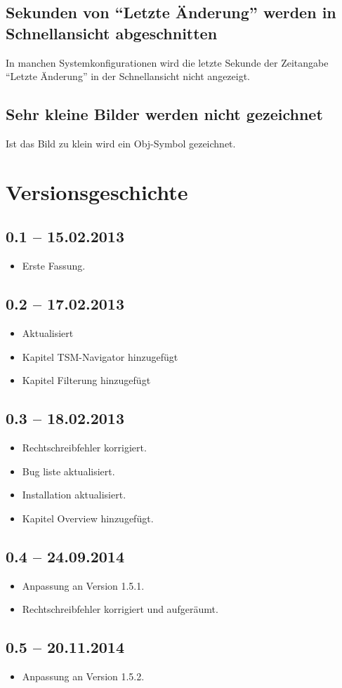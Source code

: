 \documentclass[11pt,a4paper,titlepage]{article}
\begin{document}
\subsection*{Sekunden von "`Letzte Änderung"' werden in Schnellansicht abgeschnitten}
In manchen Systemkonfigurationen wird die letzte Sekunde der Zeitangabe "`Letzte Änderung"' in der Schnellansicht nicht angezeigt.

\subsection*{Sehr kleine Bilder werden nicht gezeichnet}
Ist das Bild zu klein wird ein Obj-Symbol gezeichnet.


\section{Versionsgeschichte}

\subsection*{0.1 -- 15.02.2013}
\begin{itemize}
 \item Erste Fassung.
\end{itemize}

\subsection*{0.2 -- 17.02.2013}
\begin{itemize}
 \item Aktualisiert
 \item Kapitel TSM-Navigator hinzugefügt
 \item Kapitel Filterung hinzugefügt
\end{itemize}
 
\subsection*{0.3 -- 18.02.2013}
\begin{itemize}
 \item Rechtschreibfehler korrigiert.
 \item Bug liste aktualisiert.
 \item Installation aktualisiert.
 \item Kapitel Overview hinzugefügt.
\end{itemize}

\subsection*{0.4 -- 24.09.2014}
\begin{itemize}
 \item Anpassung an Version 1.5.1.
 \item Rechtschreibfehler korrigiert und aufgeräumt.
\end{itemize}

\subsection*{0.5 -- 20.11.2014}
\begin{itemize}
 \item Anpassung an Version 1.5.2.
\end{itemize}

 
\end{document}
